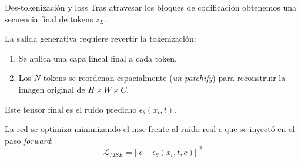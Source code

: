 \begin{frame}{Des-tokenización y loss}
Tras atravesar los bloques de codificación obtenemos una \alert{secuencia final de tokens} $z_L$.

La salida generativa requiere revertir la tokenización:
\begin{enumerate}
    \item Se aplica una capa lineal final a cada token.
    \item Los $N$ tokens se reordenan espacialmente (\textit{un-patchify}) para reconstruir la imagen original de $H \times W \times C$.
\end{enumerate}

Este tensor final es el \alert{ruido predicho} $\epsilon_\theta(x_t, t)$.

La red se optimiza minimizando el \alert{\gls{mse}} frente al ruido real $\epsilon$ que se inyectó en el paso \textit{forward}:
$$ \mathcal{L}_{MSE} = || \epsilon - \epsilon_\theta(x_t, t, c) ||^2 $$
\end{frame}


